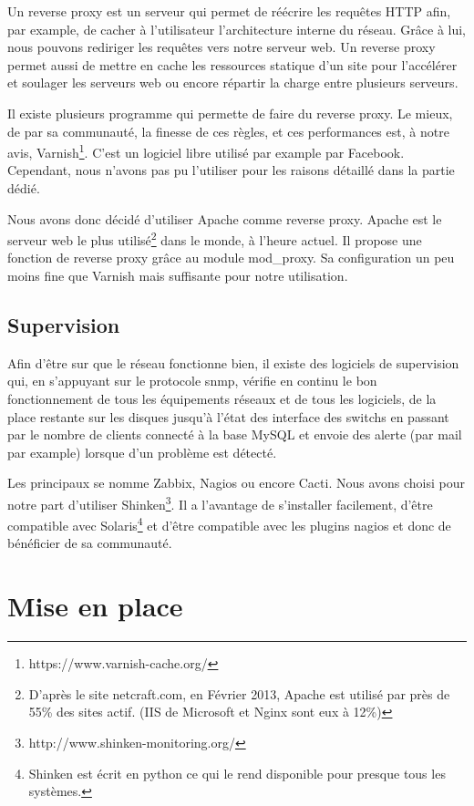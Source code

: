 \documentclass{report}
\begin{document}
Un reverse proxy est un serveur qui permet de réécrire les requêtes HTTP afin, par example, de cacher à l'utilisateur l'architecture interne du réseau. Grâce à lui, nous pouvons rediriger les requêtes vers notre serveur web.
Un reverse proxy permet aussi de mettre en cache les ressources statique d'un site pour l'accélérer et soulager les serveurs web ou encore répartir la charge entre plusieurs serveurs.

Il existe plusieurs programme qui permette de faire du reverse proxy. Le mieux, de par sa communauté, la finesse de ces règles, et ces performances est, à notre avis, Varnish\footnote{https://www.varnish-cache.org/}. C'est un logiciel libre utilisé par example par Facebook. Cependant, nous n'avons pas pu l'utiliser pour les raisons détaillé dans la partie dédié.

Nous avons donc décidé d'utiliser Apache comme reverse proxy. Apache est le serveur web le plus utilisé\footnote{D'après le site netcraft.com, en Février 2013, Apache est utilisé par près de 55\% des sites actif. (IIS de Microsoft et Nginx sont eux à 12\%)} dans le monde, à l'heure actuel. Il propose une fonction de reverse proxy grâce au module mod\_proxy. Sa configuration un peu moins fine que Varnish mais suffisante pour notre utilisation.

\section{Supervision}
Afin d'être sur que le réseau fonctionne bien, il existe des logiciels de supervision qui, en s'appuyant sur le protocole snmp, vérifie en continu le bon fonctionnement de tous les équipements réseaux et de tous les logiciels, de la place restante sur les disques jusqu'à l'état des interface des switchs en passant par le nombre de clients connecté à la base MySQL et envoie des alerte (par mail par example) lorsque d'un problème est détecté.

Les principaux se nomme Zabbix, Nagios ou encore Cacti. Nous avons choisi pour notre part d'utiliser Shinken\footnote{http://www.shinken-monitoring.org/}. Il a l'avantage de s'installer facilement, d'être compatible avec Solaris\footnote{Shinken est écrit en python ce qui le rend disponible pour presque tous les systèmes.} et d'être compatible avec les plugins nagios et donc de bénéficier de sa communauté.

\chapter{Mise en place}
\end{document}
